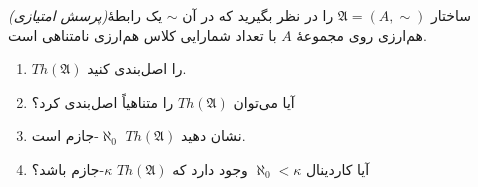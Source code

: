 \textit{(پرسش امتیازی)}\quad ساختار $\mathfrak{A} = (A, \sim)$ را در نظر بگیرید که در آن $\sim$ یک رابطهٔ هم‌ارزی روی مجموعهٔ $A$ با تعداد شمارایی کلاس هم‌ارزی نامتناهی است.
\begin{enumerate}[label=(\alph*)]
  \item $Th(\mathfrak{A})$ را اصل‌بندی کنید.
  \item آیا می‌توان $Th(\mathfrak{A})$ را متناهیاً اصل‌بندی کرد؟
  \item نشان دهید $Th(\mathfrak{A})$ $\aleph_0$-جازم است.
  \item آیا کاردینال $\aleph_0 < \kappa$ وجود دارد که $Th(\mathfrak{A})$ $\kappa$-جازم باشد؟
\end{enumerate}\quad
\begin{ans}
\end{ans}
